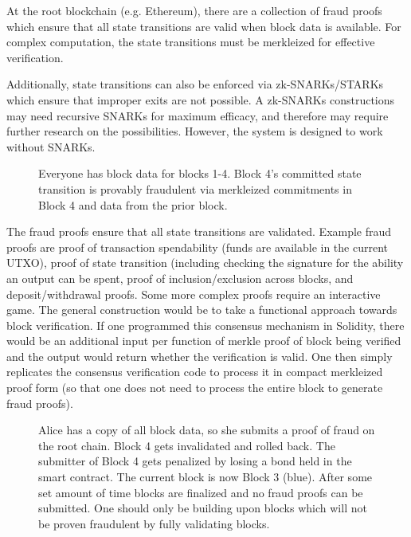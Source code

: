 \documentclass[letterpaper, 11pt]{article}
\begin{document}
At the root blockchain (e.g. Ethereum), there are a collection of fraud proofs
which ensure that all state transitions are valid when block data is available.
For complex computation, the state transitions must be merkleized for effective
verification.

Additionally, state transitions can also be enforced via zk-SNARKs/STARKs which
ensure that improper exits are not possible. A zk-SNARKs constructions may need
recursive SNARKs for maximum efficacy, and therefore may require further
research on the possibilities. However, the system is designed to work without
SNARKs.

\begin{figure}[H]
	\caption{
		Everyone has block data for blocks 1-4. Block 4's committed
		state transition is provably fraudulent via merkleized
		commitments in Block 4 and data from the prior block.
		}
\end{figure}

The fraud proofs ensure that all state transitions are validated. Example fraud
proofs are proof of transaction spendability (funds are available in the
current UTXO), proof of state transition (including checking the signature for
the ability an output can be spent, proof of inclusion/exclusion across blocks,
and deposit/withdrawal proofs. Some more complex proofs require an interactive
game. The general construction would be to take a functional approach towards
block verification. If one programmed this consensus mechanism in Solidity,
there would be an additional input per function of merkle proof of block being
verified and the output would return whether the verification is valid. One
then simply replicates the consensus verification code to process it in compact
merkleized proof form (so that one does not need to process the entire block to
generate fraud proofs).

\begin{figure}[H]
	\caption{
		Alice has a copy of all block data, so she submits a proof of
		fraud on the root chain. Block 4 gets invalidated and rolled
		back. The submitter of Block 4 gets penalized by losing a bond
		held in the smart contract. The current block is now Block 3
		(blue). After some set amount of time blocks are finalized and
		no fraud proofs can be submitted. One should only be building
		upon blocks which will not be proven fraudulent by fully
		validating blocks.
		}
\end{figure}
\end{document}
